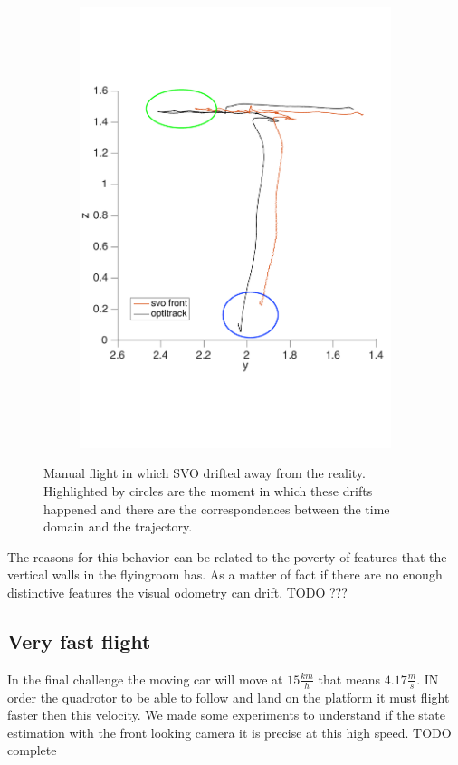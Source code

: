 \begin{figure}[!htbp]
\begin{subfigure}[b]{0.4\textwidth}
        \includegraphics[width=\textwidth]{img/fly_with_landing_trajectory_y.pdf}
        \label{fig:comparision_svo_position_drifting_y}
   \end{subfigure}
  \caption{Manual flight in which SVO drifted away from the reality. Highlighted by circles are the moment in which these drifts happened and there are the correspondences between the time domain and the trajectory. }
  \label{fig:svo_position_driftind}
\end{figure} 

The reasons for this behavior can be related to the poverty of features that the vertical walls in the flyingroom has. As a matter of fact if there are no enough distinctive features the visual odometry can drift. TODO ???

\subsection{Very fast flight}
In the final challenge the moving car will move at $15\frac{km}{h}$ that means $4.17\frac{m}{s}$. IN order the quadrotor to be able to follow and land on the platform it must flight faster then this velocity. We made some experiments to understand if the state estimation with the front looking camera it is precise at this high speed. TODO complete


